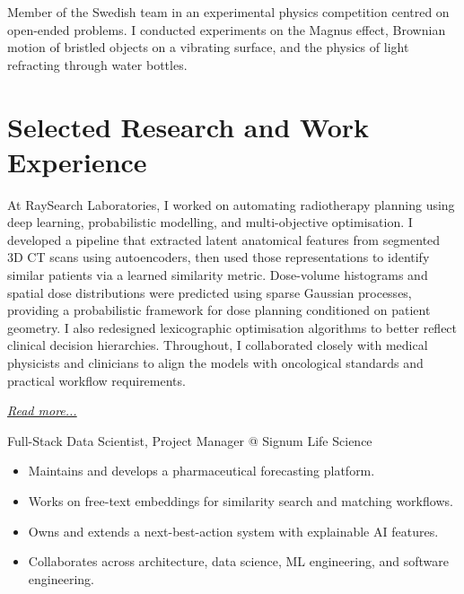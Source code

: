 \documentclass[11pt,a4paper]{moderncv}
\begin{document}
\label{sec:iypt}
 {
    Member of the Swedish team in an experimental physics competition centred on open-ended problems. I conducted experiments on the Magnus effect, Brownian motion of bristled objects on a vibrating surface, and the physics of light refracting through water bottles.
}{}

\section{Selected Research and Work Experience}

\label{sec:raysearch}
 {
    At RaySearch Laboratories, I worked on automating radiotherapy planning using deep learning, probabilistic modelling, and multi-objective optimisation.
    \newline\hspace*{2em}
    I developed a pipeline that extracted latent anatomical features from segmented 3D CT scans using autoencoders, then used those representations to identify similar patients via a learned similarity metric.
    \newline\hspace*{2em}
    Dose-volume histograms and spatial dose distributions were predicted using sparse Gaussian processes, providing a probabilistic framework for dose planning conditioned on patient geometry. I also redesigned lexicographic optimisation algorithms to better reflect clinical decision hierarchies.
    \newline\hspace*{2em}
    Throughout, I collaborated closely with medical physicists and clinicians to align the models with oncological standards and practical workflow requirements.
}{}

\hfill{\small{\textit{\hyperref[sec:raysearch]{Read more...}}}}

\large{Full-Stack Data Scientist, Project Manager @ Signum Life Science}
\normalsize
\begin{itemize}
    \item Maintains and develops a pharmaceutical forecasting platform.
    \item Works on free-text embeddings for similarity search and matching workflows.
    \item Owns and extends a next-best-action system with explainable AI features.
    \item Collaborates across architecture, data science, ML engineering, and software engineering.
\end{itemize}
\end{document}
